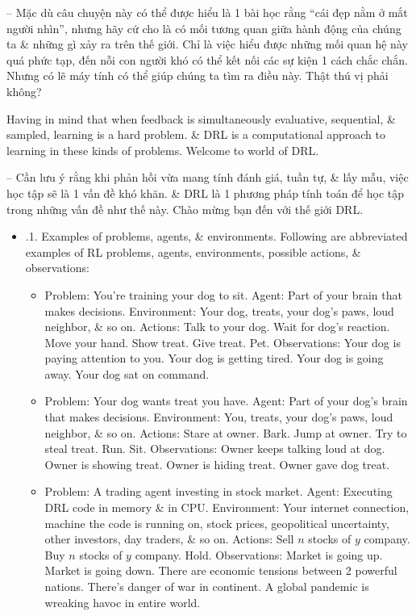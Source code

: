 \documentclass{article}
\begin{document}
\begin{itemize}
\begin{itemize}
        -- Mặc dù câu chuyện này có thể được hiểu là 1 bài học rằng ``cái đẹp nằm ở mắt người nhìn'', nhưng hãy cứ cho là có mối tương quan giữa hành động của chúng ta \& những gì xảy ra trên thế giới. Chỉ là việc hiểu được những mối quan hệ này quá phức tạp, đến nỗi con người khó có thể kết nối các sự kiện 1 cách chắc chắn. Nhưng có lẽ máy tính có thể giúp chúng ta tìm ra điều này. Thật thú vị phải không?

        Having in mind that when feedback is simultaneously evaluative, sequential, \& sampled, learning is a hard problem. \& DRL is a computational approach to learning in these kinds of problems. Welcome to world of DRL.

        -- Cần lưu ý rằng khi phản hồi vừa mang tính đánh giá, tuần tự, \& lấy mẫu, việc học tập sẽ là 1 vấn đề khó khăn. \& DRL là 1 phương pháp tính toán để học tập trong những vấn đề như thế này. Chào mừng bạn đến với thế giới DRL.
        \begin{itemize}
            \item {.1. Examples of problems, agents, \& environments.} Following are abbreviated examples of RL problems, agents, environments, possible actions, \& observations:
            \begin{itemize}
                \item Problem: You're training your dog to sit. Agent: Part of your brain that makes decisions. Environment: Your dog, treats, your dog's paws, loud neighbor, \& so on. Actions: Talk to your dog. Wait for dog's reaction. Move your hand. Show treat. Give treat. Pet. Observations: Your dog is paying attention to you. Your dog is getting tired. Your dog is going away. Your dog sat on command.
                \item Problem: Your dog wants treat you have. Agent: Part of your dog's brain that makes decisions. Environment: You, treats, your dog's paws, loud neighbor, \& so on. Actions: Stare at owner. Bark. Jump at owner. Try to steal treat. Run. Sit. Observations: Owner keeps talking loud at dog. Owner is showing treat. Owner is hiding treat. Owner gave dog treat.
                \item Problem: A trading agent investing in stock market. Agent: Executing DRL code in memory \& in CPU. Environment: Your internet connection, machine the code is running on, stock prices, geopolitical uncertainty, other investors, day traders, \& so on. Actions: Sell $n$ stocks of $y$ company. Buy $n$ stocks of $y$ company. Hold. Observations: Market is going up. Market is going down. There are economic tensions between 2 powerful nations. There's danger of war in continent. A global pandemic is wreaking havoc in entire world.

\end{itemize}
\end{itemize}
\end{itemize}
\end{itemize}
\end{document}
